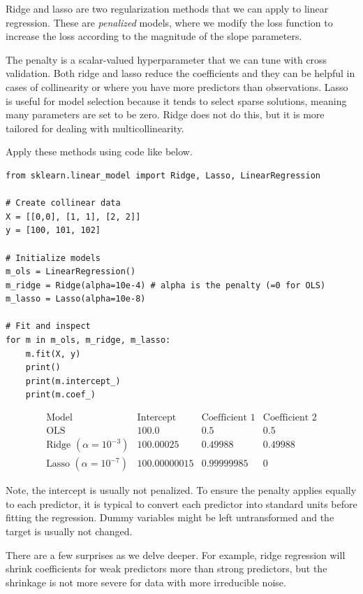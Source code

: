 Ridge and lasso are two regularization methods that we can apply to linear regression. These are \emph{penalized} models, where we modify the loss function to increase the loss according to the magnitude of the slope parameters.

The penalty is a scalar-valued hyperparameter that we can tune with cross validation. Both ridge and lasso reduce the coefficients and they can be helpful in cases of collinearity or where you have more predictors than observations. 
Lasso is useful for model selection because it tends to select sparse solutions, meaning many parameters are set to be zero. Ridge does not do this, but it is more tailored for dealing with multicollinearity. 

Apply these methods using code like below.

\begin{lstlisting}
from sklearn.linear_model import Ridge, Lasso, LinearRegression

# Create collinear data
X = [[0,0], [1, 1], [2, 2]]
y = [100, 101, 102]

# Initialize models
m_ols = LinearRegression()
m_ridge = Ridge(alpha=10e-4) # alpha is the penalty (=0 for OLS)
m_lasso = Lasso(alpha=10e-8)

# Fit and inspect
for m in m_ols, m_ridge, m_lasso:
    m.fit(X, y)
    print()
    print(m.intercept_)
    print(m.coef_)
\end{lstlisting}


$$
\begin{array}{lccc}
\text{Model} & \text{Intercept} & \text{Coefficient 1} & \text{Coefficient 2} \\
\hline
\text{OLS} & 100.0 & 0.5 & 0.5 \\
\text{Ridge } (\alpha = 10^{-3}) & 100.00025 & 0.49988 & 0.49988 \\
\text{Lasso } (\alpha = 10^{-7}) & 100.00000015 & 0.99999985 & 0
\end{array}
$$

Note, the intercept is usually not penalized. To ensure the penalty applies equally to each predictor, it is typical to convert each predictor into standard units before fitting the regression. Dummy variables might be left untransformed and the target is usually not changed.


There are a few surprises as we delve deeper. For example, ridge regression will shrink coefficients for weak predictors more than strong predictors, but the shrinkage is not more severe for data with more irreducible noise. 


